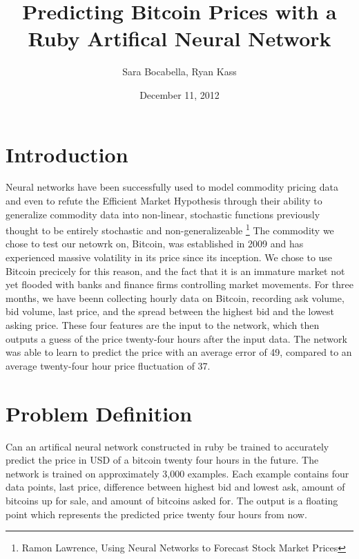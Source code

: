\documentclass[a4paper,10pt]{article}
\title{Predicting Bitcoin Prices with a Ruby Artifical Neural Network}
\author{Sara Bocabella, Ryan Kass}
\date{December 11, 2012}
\begin{document}
\maketitle
\section{Introduction}
Neural networks have been successfully used to
model commodity pricing data and even to refute the Efficient Market Hypothesis
through their ability to generalize commodity data into non-linear, 
stochastic functions previously thought to be entirely stochastic and non-generalizeable
\footnote{Ramon Lawrence, Using Neural Networks to Forecast Stock Market Prices}
The commodity we chose to test our netowrk on, Bitcoin, was established in 2009 and has 
experienced massive volatility in its price since its inception.  We chose to use Bitcoin 
precicely for this reason, and the fact that it is an immature market not yet flooded with
banks and finance firms controlling market movements.
\newline \newline
For three months, we have beenn collecting hourly data on Bitcoin, recording
ask volume, bid volume, last price, and the spread between the highest bid and the lowest asking price.
These four features are the input to the network, which then outputs a guess of the price twenty-four
hours after the input data.  The network was able to learn to predict the price with an average error
of 49\cent, compared to an average twenty-four hour price fluctuation of 37\cent. 
\section{Problem Definition}
Can an artifical neural network constructed in ruby be trained to accurately predict the price in USD
of a bitcoin twenty four hours in the future.  The network is trained on approximately 3,000 examples.
Each example contains four data points, last price, difference between highest bid and lowest ask,
amount of bitcoins up for sale, and amount of bitcoins asked for.  The output is a floating point which
represents the predicted price twenty four hours from now.
\end{document}
